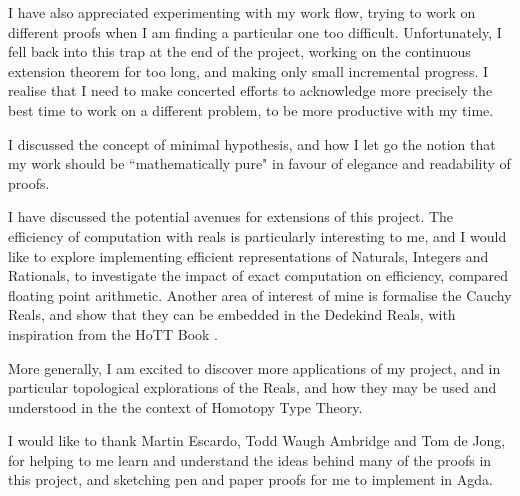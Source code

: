 \documentclass[ProjectReport]{subfiles}
\begin{document}
I have also appreciated experimenting with my work flow, trying to work on different proofs when I am finding a particular one too difficult. Unfortunately, I fell back into this trap at the end of the project, working on the continuous extension theorem for too long, and making only small incremental progress. I realise that I need to make concerted efforts to acknowledge more precisely the best time to work on a different problem, to be more productive with my time.

I discussed the concept of minimal hypothesis, and how I let go the notion that my work should be ``mathematically pure" in favour of elegance and readability of proofs.

I have discussed the potential avenues for extensions of this project. The efficiency of computation with reals is particularly interesting to me, and I would like to explore implementing efficient representations of Naturals, Integers and Rationals, to investigate the impact of exact computation on efficiency, compared floating point arithmetic. Another area of interest of mine is formalise the Cauchy Reals, and show that they can be embedded in the Dedekind Reals, with inspiration from the HoTT Book \cite[Section 11.3]{hottbook}.

More generally, I am excited to discover more applications of my project, and in particular topological explorations of the Reals, and how they may be used and understood in the the context of Homotopy Type Theory.

I would like to thank Martin Escardo, Todd Waugh Ambridge and Tom de Jong, for helping to me learn and understand the ideas behind many of the proofs in this project, and sketching pen and paper proofs for me to implement in Agda.
\end{document}

